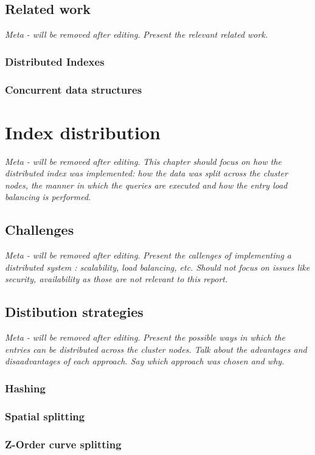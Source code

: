 \documentclass[11pt,a4paper]{globis-book}
\begin{document}
\section{Related work}

\textit{Meta - will be removed after editing.}
\textit{Present the relevant related work.}
\subsection{Distributed Indexes}
\subsection{Concurrent data structures}

\chapter{Index distribution}

\textit{Meta - will be removed after editing.}
\textit{This chapter should focus on how the distributed index was implemented: how the data was split across the cluster nodes, the manner in which the queries are executed and how the entry load balancing is performed.} 
\section{Challenges}

\textit{Meta - will be removed after editing.}
\textit{Present the callenges of implementing a distributed system : scalability, load balancing, etc. Should not focus on issues like security, availability as those are not relevant to this report.}
\section{Distibution strategies}

\textit{Meta - will be removed after editing.}
\textit{Present the possible ways in which the entries can be distributed across the cluster nodes. Talk about the advantages and disaadvantages of each approach. Say which approach was chosen and why.}
\subsection{Hashing}
\subsection{Spatial splitting}
\subsection{Z-Order curve splitting}
\end{document}
